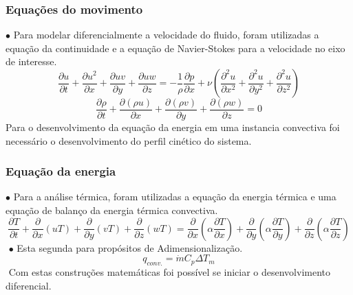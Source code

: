 \documentclass[xcolor=dvipsnames,10pt,aspectratio=169]{beamer}
\begin{document}
		\begin{frame}
		\frametitle{Equações do movimento}
		$\bullet$ Para modelar diferencialmente a velocidade do fluido, foram utilizadas a equação da continuidade e a equação de Navier-Stokes para a velocidade no eixo de interesse.
		\begin{equation}
		\frac{\partial u}{\partial t} + \frac{\partial u^2}{\partial x} + \frac{\partial uv}{\partial y} + \frac{\partial uw}{\partial z} = - \frac{1}{\rho} \frac{\partial {p}}{\partial x} + \nu \left( \frac{\partial^2 u}{\partial x^2} + \frac{\partial^2 u}{\partial y^2} + \frac{\partial^2 u}{\partial z^2}   \right)
		\end{equation}
		\begin{equation}
		\frac{\partial \rho}{\partial t} +  \frac{\partial (\rho u)}{\partial x} + \frac{\partial (\rho v)}{\partial y} + \frac{\partial (\rho w)}{\partial z} = 0
		\end{equation}
		Para o desenvolvimento da equação da energia em uma instancia convectiva foi necessário o desenvolvimento do perfil cinético do sistema.
		\end{frame}





		\begin{frame}
		\frametitle{Equação da energia}
		$\bullet$ Para a análise térmica, foram utilizadas a equação da energia térmica e uma equação de balanço da energia térmica convectiva.
		\begin{equation}
		\frac{\partial T}{\partial t} + {\frac{\partial{}}{\partial{x}} (uT)} + {\frac{\partial{}}{\partial{y}} (vT)} + {\frac{\partial{}}{\partial{z}} (wT)}
		=
		{\frac{\partial{}}{\partial{x}}} \left(\alpha {\frac{\partial{T}}{\partial{x}}} \right) +
		{\frac{\partial{}}{\partial{y}}} \left(\alpha {\frac{\partial{T}}{\partial{y}}} \right) +
		{\frac{\partial{}}{\partial{z}}} \left(\alpha {\frac{\partial{T}}{\partial{z}}} \right) 
		\end{equation}
		$ $
		$\bullet$ Esta segunda para propósitos de Adimensionalização.
		\begin{equation}\label{c_h_e}
		q_{conv.} = \dot{m} C_p \Delta T_m
		\end{equation}
		$ $
		Com estas construções matemáticas foi possível se iniciar o desenvolvimento diferencial.
		\end{frame}




		
		
\end{document}
